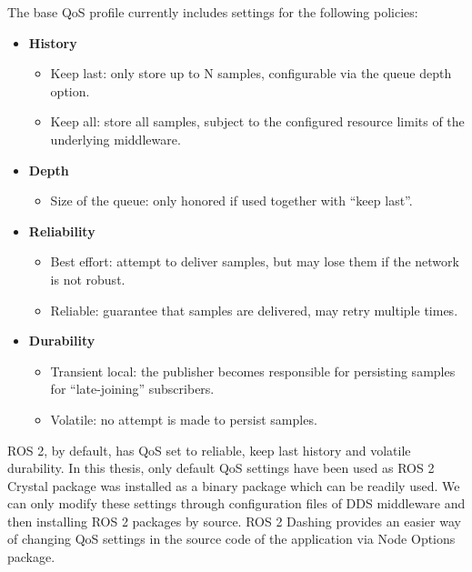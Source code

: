 \documentclass[%
xelatex,
	oneside,		%
	12pt,			%
	parskip=half,	%
	abstracton,
	chapterprefix=true%
    appendixprefix=true]
{scrbook}
\begin{document}
The base QoS profile currently includes settings for the following policies:
\begin{itemize}

\item {\bfseries History}
\begin{itemize}
\item Keep last: only store up to N samples, configurable via the queue depth option.

\item Keep all: store all samples, subject to the configured resource limits of the underlying middleware.
\end{itemize}
\item {\bfseries Depth}
\begin{itemize}
\item Size of the queue: only honored if used together with “keep last”.
\end{itemize}
\item {\bfseries Reliability}
\begin{itemize}
\item Best effort: attempt to deliver samples, but may lose them if the network is not robust.

\item Reliable: guarantee that samples are delivered, may retry multiple times.
\end{itemize}
\item {\bfseries Durability}
\begin{itemize}
\item Transient local: the publisher becomes responsible for persisting samples for “late-joining” subscribers.

\item Volatile: no attempt is made to persist samples.\cite{qos}
\end{itemize}
\end{itemize}

ROS 2, by default, has QoS set to reliable, keep last history and volatile durability. In this thesis, only default QoS settings have been used as ROS 2 Crystal package was installed as a binary package which can be readily used. We can only modify these settings through configuration files of DDS middleware and then installing ROS 2 packages by source. ROS 2 Dashing provides an easier way of changing QoS settings in the source code of the application via Node Options package.
\clearpage
\end{document}
